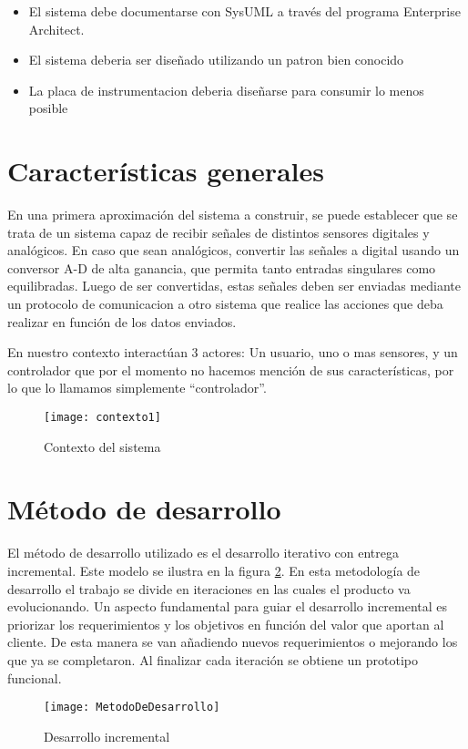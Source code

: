 \begin{itemize}
	\item El sistema debe documentarse con SysUML a través del programa Enterprise Architect.
	\item El sistema deberia ser diseñado utilizando un patron bien conocido
	\item La placa de instrumentacion deberia diseñarse para consumir lo menos posible
\end{itemize}



\section{Características generales} %
\label{sec:caracteristicas_generales}

En una primera aproximación del sistema a construir, se puede establecer que se trata de un sistema capaz de recibir señales de distintos sensores digitales y analógicos. En caso que sean analógicos, convertir las señales a digital usando un conversor A-D de alta ganancia, que permita tanto entradas singulares como equilibradas. Luego de ser convertidas, estas señales deben ser enviadas mediante un protocolo de comunicacion a otro sistema que realice las acciones que deba realizar en función de los datos enviados.

En nuestro contexto interactúan 3 actores: Un usuario, uno o mas sensores, y un controlador que por el momento no hacemos mención de sus características, por lo que lo llamamos simplemente ``controlador''.

\begin{figure}[h]
  \centering
  \texttt{[image: contexto1]}
  \caption{Contexto del sistema}\label{fig:contexto1}
\end{figure}


\section{Método de desarrollo} %
\label{sec:metodo_de_desarrollo}

El método de desarrollo utilizado es el desarrollo iterativo con entrega incremental. Este modelo se ilustra en la figura \ref{fig:MetodoDeDesarrollo}. En esta metodología de desarrollo el trabajo se divide en iteraciones en las cuales el producto va evolucionando. 
Un aspecto fundamental para guiar el desarrollo incremental es priorizar los requerimientos y los objetivos en función del valor que aportan al cliente. De esta manera se van añadiendo nuevos requerimientos o mejorando los que ya se completaron. Al finalizar cada iteración se obtiene un prototipo funcional.

\begin{figure}[h]
  \centering
  \texttt{[image: MetodoDeDesarrollo]}
  \caption{Desarrollo incremental}\label{fig:MetodoDeDesarrollo}
\end{figure}




